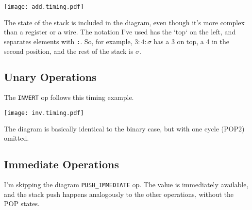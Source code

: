 \documentclass{article}
\begin{document}
\begin{center}
\texttt{[image: add.timing.pdf]}
\end{center}

The state of the stack is included in the diagram, even though it's more complex than a register or a wire.
The notation I've used has the `top` on the left, and separates elements with \verb':'.
So, for example, $3:4:\sigma$ has a 3 on top, a 4 in the second position, and the rest of the stack is $\sigma$.


%
%

\subsection{Unary Operations}
The \verb'INVERT' op follows this timing example.
\begin{center}
\texttt{[image: inv.timing.pdf]}
\end{center}
The diagram is basically identical to the binary case, but with one cycle (POP2) omitted.

\subsection{Immediate Operations}
I'm skipping the diagram \verb'PUSH_IMMEDIATE' op.
The value is immediately available, and the stack push happens analogously to the other operations,
without the POP states.
\end{document}

